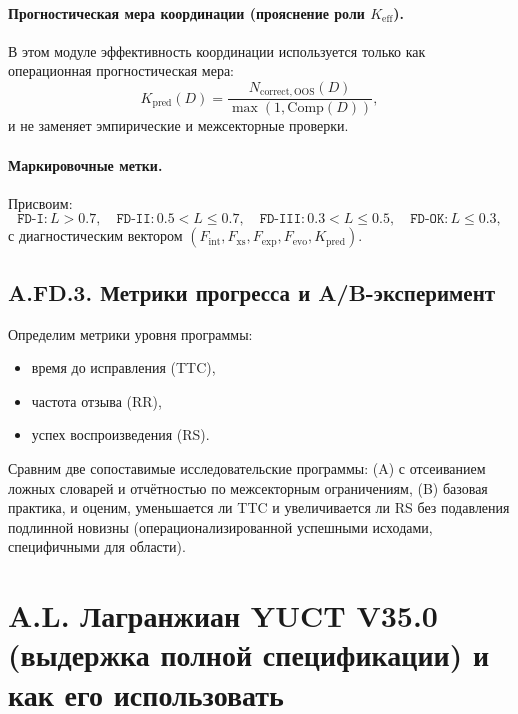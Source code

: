 \documentclass[11pt,a4paper]{article}
\newcommand{\Keff}{K_{\mathrm{eff}}}
\newcommand{\Kpred}{K_{\mathrm{pred}}}
\begin{document}
	\paragraph{Прогностическая мера координации (прояснение роли $\Keff$).}
	В этом модуле эффективность координации используется только как операционная прогностическая мера:
	\[
	\Kpred(D)=\frac{N_{\mathrm{correct,OOS}}(D)}{\max(1,\mathrm{Comp}(D))},
	\]
	и не заменяет эмпирические и межсекторные проверки.
	
	\paragraph{Маркировочные метки.}
	Присвоим:
	\[
	\texttt{FD-I}: L>0.7,\quad
	\texttt{FD-II}: 0.5<L\le0.7,\quad
	\texttt{FD-III}: 0.3<L\le0.5,\quad
	\texttt{FD-OK}: L\le0.3,
	\]
	с диагностическим вектором $(F_{\mathrm{int}},F_{\mathrm{xs}},F_{\mathrm{exp}},F_{\mathrm{evo}},\Kpred)$.
	
	\subsection*{A.FD.3. Метрики прогресса и A/B-эксперимент}
	Определим метрики уровня программы:
	\begin{itemize}[leftmargin=*]
		\item время до исправления (TTC),
		\item частота отзыва (RR),
		\item успех воспроизведения (RS).
	\end{itemize}
	Сравним две сопоставимые исследовательские программы: (A) с отсеиванием ложных словарей и отчётностью по межсекторным ограничениям, (B) базовая практика, и оценим, уменьшается ли TTC и увеличивается ли RS без подавления подлинной новизны (операционализированной успешными исходами, специфичными для области).
	
	\section*{A.L. Лагранжиан YUCT V35.0 (выдержка полной спецификации) и как его использовать}
	
\end{document}
